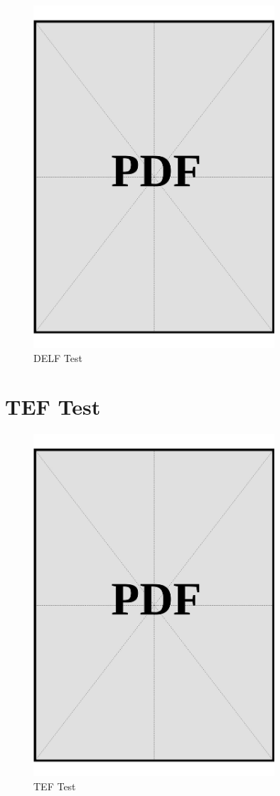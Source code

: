 \begin{figure}[ht]
  \centering
  \includegraphics[page=1, width=0.8\textwidth]{../docs/applicant/language-proficiency/french/delf.pdf}
  \caption{DELF Test}
  \label{pdf:delf-page1}
\end{figure}

\clearpage

\section{TEF Test}\label{sec:tef}

\begin{figure}[ht]
  \centering
  \includegraphics[page=1, width=0.8\textwidth]{../docs/applicant/language-proficiency/french/tef.pdf}
  \caption{TEF Test}
  \label{pdf:tef-page1}
\end{figure}

\clearpage